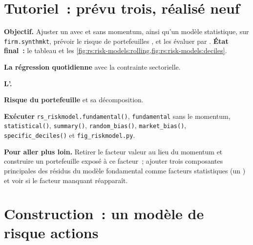 \section{Tutoriel~: prévu trois, réalisé neuf}\label{tut:rs:risk-models:tut}

\begin{tutorial}
\textbf{Objectif.} Ajuster un  avec et sans momentum, ainsi qu'un modèle statistique, sur \texttt{firm.synthmkt}, prévoir le risque de portefeuilles ,
et les évaluer par . \textbf{État final~:} le tableau et les \cref{fig:rs:risk-models:rolling,fig:rs:risk-models:deciles}.
\begin{tutsteps}
\item \textbf{La régression quotidienne} avec la contrainte sectorielle.
\label{lst:rs:risk-models:csreg}
\item \textbf{L'.}
\label{lst:rs:risk-models:vra}
\item \textbf{Risque du portefeuille} et sa décomposition.
\label{lst:rs:risk-models:risk}
\item \textbf{Exécuter} \texttt{rs\_riskmodel.fundamental()}, \texttt{fundamental} sans le momentum, \texttt{statistical()}, \texttt{summary()}, \texttt{random\_bias()},
\texttt{market\_bias()}, \texttt{specific\_deciles()} et \texttt{fig\_riskmodel.py}.
\end{tutsteps}
\textbf{Pour aller plus loin.} Retirer le facteur valeur au lieu du momentum et construire un portefeuille exposé à ce facteur~; ajouter trois composantes principales des résidus du modèle fondamental
comme facteurs statistiques (un ) et voir si le facteur manquant réapparaît.
\end{tutorial}

\section{Construction~: un modèle de risque actions}\label{bld:rs:risk-models:riskmodel}

